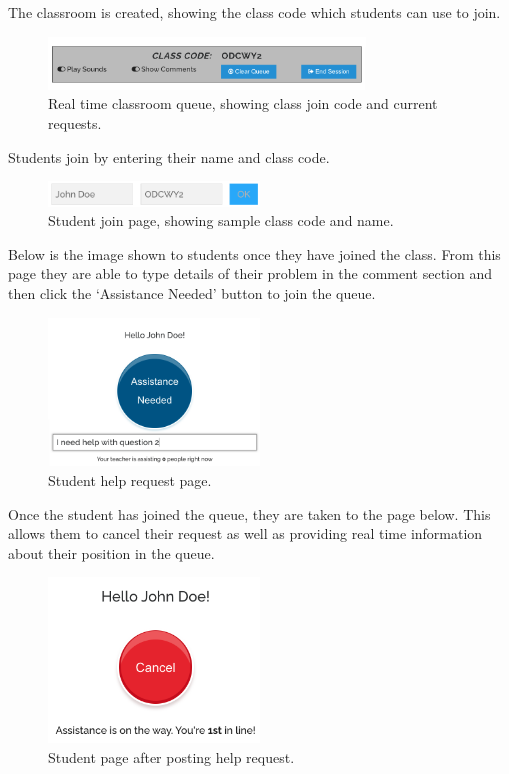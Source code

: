 The classroom is created, showing the class code which students can use to join.

\FloatBarrier
\begin{figure}[H]
  \centering
  \includegraphics[width=0.75\textwidth]{2context/images/cq2.png}
  \caption{Real time classroom queue, showing class join code and current requests.}
\end{figure}

Students join by entering their name and class code.

\FloatBarrier
\begin{figure}[H]
  \centering
  \includegraphics[width=0.5\textwidth]{2context/images/cq3.png}
  \caption{Student join page, showing sample class code and name.}
\end{figure}

Below is the image shown to students once they have joined the class. From this page they are able to type details of their problem in the comment section and then click the `Assistance Needed' button to join the queue.

\FloatBarrier
\begin{figure}[H]
  \centering
  \includegraphics[width=0.5\textwidth]{2context/images/cq4.png}
  \caption{Student help request page.}
\end{figure}

Once the student has joined the queue, they are taken to the page below. This allows them to cancel their request as well as providing real time information about their position in the queue.

\FloatBarrier
\begin{figure}[H]
  \centering
  \includegraphics[width=0.5\textwidth]{2context/images/cq5.png}
  \caption{Student page after posting help request.}
\end{figure}


